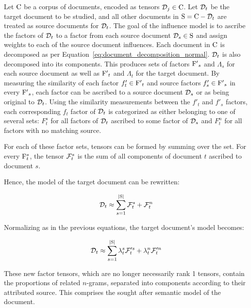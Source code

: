 \documentclass[../ut-dissertation.tex]{subfiles}
\begin{document}
Let $\mathrm{C}$ be a corpus of documents, encoded as tensors
$\mathcal{D}_j \in \mathrm{C}$.  Let $\mathcal{D}_t$ be the target document to
be studied, and all other documents in $\mathrm{S}=\mathrm{C} - \mathcal{D}_t$
are treated as source documents for $\mathcal{D}_t$.  The goal of the
influence model is to ascribe the factors of $\mathcal{D}_t$ to a factor
from each source document $\mathcal{D}_s\in \mathrm{S}$ and assign weights
to each of the source document influences. Each document in $\mathrm{C}$
is decomposed as per Equation~\ref{eq:document_decomposition_normal}.
$\mathcal{D}_t$ is also decomposed into its components.  This produces
sets of factors $\mathrm{F'}_s$ and $\Lambda_s$ for each source document
as well as $\mathrm{F'}_t$ and $\Lambda_t$ for the target document.  By
measuring the similarity of each factor $f'_{t}\in\mathrm{F'}_{t}$ and
source factors $f'_{s}\in \mathrm{F'}_s$ in every $\mathrm{F'}_s$, each
factor can be ascribed to a source document $\mathcal{D}_s$ or as being
original to $\mathcal{D}_t$.  Using the similarity measurements between
the $f'_t$ and $f'_s$ factors, each corresponding $f_t$ factor of
$\mathcal{D}_t$ is categorized as either belonging to one of several
sets: $F^s_t$ for all factors of $\mathcal{D}_t$ ascribed to some factor
of $\mathcal{D}_s$ and $F^n_t$ for all factors with no matching source.

For each of these factor sets, tensors can be formed by summing over
the set.  For every $\mathrm{F}^s_t$, the tensor $\mathcal{F}^s_t$ is the
sum of all components of document $t$ ascribed to document $s$.  

Hence, the model of the target document can be rewritten:

\begin{equation} \label{eq:influence_factors}
  \mathcal{D}_t \approx \sum_{s=1}^{|\mathrm{S}|} \mathcal{F}^s_t + \mathcal{F}^n_t
\end{equation}

Normalizing as in the previous equations, the target
document's model becomes:

\begin{equation} \label{eq:influence_factors_normalized}
  \mathcal{D}_t \approx \sum_{s=1}^{|\mathrm{S}|} \lambda^s_t \mathcal{F}'^s_t +
  \lambda^n_t \mathcal{F}'^n_t
\end{equation}

These new factor tensors, which are no longer necessarily rank 1
tensors, contain the proportions of related $n$-grams, separated into
components according to their attributed source.  This comprises the
sought after semantic model of the document.  
\end{document}
